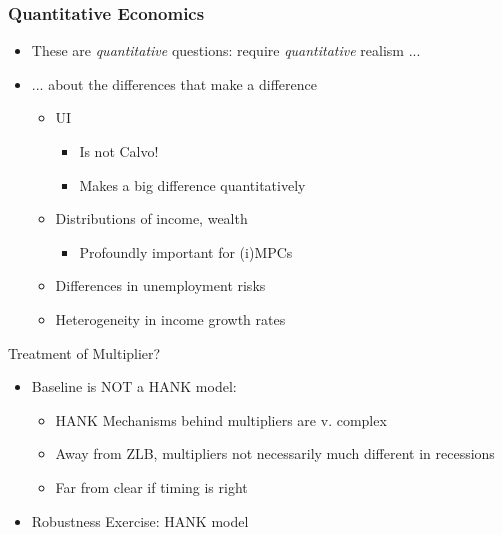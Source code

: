 \documentclass[pdflatex,aspectratio=169]{beamer}
\begin{document}
\begin{frame}
  \frametitle{Quantitative Economics}
  \begin{itemize}[<+->]
    \item These are \textit{quantitative} questions: require \textit{quantitative} realism ...
    \item ... about the differences that make a difference
    \begin{itemize}[<+->]
    \item UI
      \begin{itemize}[<+->]
      \item Is not Calvo!
        \item Makes a big difference quantitatively
      \end{itemize}
    \item Distributions of income, wealth
      \begin{itemize}
      \item Profoundly important for (i)MPCs
      \end{itemize} 
      \item Differences in unemployment risks
      \item Heterogeneity in income growth rates
  \end{itemize}
\end{itemize}

\pause Treatment of Multiplier? 
\begin{itemize}[<+->]
  \item Baseline is NOT a HANK model:
    \begin{itemize}[<+->]
    \item HANK Mechanisms behind multipliers are v. complex
    \item Away from ZLB, multipliers not necessarily much different in recessions
    \item Far from clear if timing is right
    \end{itemize}
  \end{itemize}
  
  \begin{itemize}[<+->]
    \itemsep = .25\bigskipamount 
    \item Robustness Exercise: HANK model 
    \end{itemize}
\end{frame}
\end{document}
